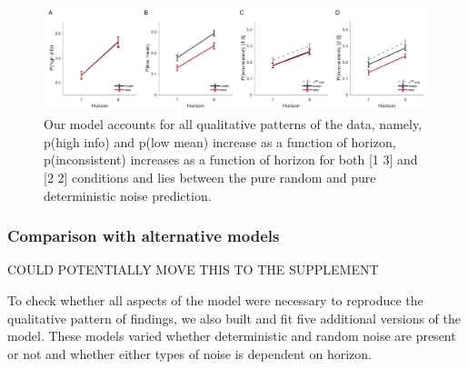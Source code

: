 \documentclass[12pt]{article}
\begin{document}
{\begin{figure}[H]
\begin{center}
	\includegraphics[width=1\textwidth]{figures/RDBayes_2noise_modelA.jpg}
	\caption{
		Our model accounts for all qualitative patterns of the data, namely, p(high info) and p(low mean) increase as a function of horizon, p(inconsistent) increases as a function of horizon for both [1 3] and [2 2] conditions and lies between the pure random and pure deterministic noise prediction.}
	\label{fig:mb3}
\end{center}
\end{figure}

\subsubsection*{Comparison with alternative models}
COULD POTENTIALLY MOVE THIS TO THE SUPPLEMENT

To check whether all aspects of the model were necessary to reproduce the qualitative pattern of findings, we also built and fit five additional versions of the model. These models varied  whether deterministic and random noise are present or not and whether either types of noise is dependent on horizon. 

}
\end{document}

